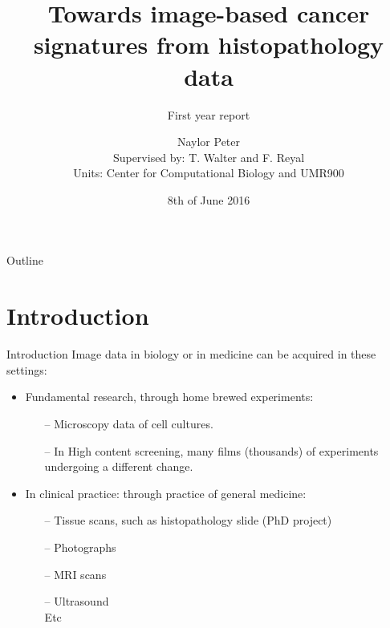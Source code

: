 \documentclass{beamer}
\title{Towards image-based cancer signatures from histopathology data}
\subtitle{First year report}
\author[Naylor Peter]{Naylor Peter\\{\small Supervised by: T. Walter and F. Reyal}\\{\small Units: Center for Computational Biology and UMR900}}
\date{8th of June 2016}
\begin{document}
\begin{frame}
  \titlepage
\end{frame}

\begin{frame}{Outline}
  \tableofcontents
\end{frame}

\section{Introduction}
\begin{frame}{Introduction}
Image data in biology or in medicine can be acquired in these settings:
\begin{itemize}
\item Fundamental research, through home brewed experiments: 

\begin{itemize}
\item[--] Microscopy data of cell cultures.
\item[--] In High content screening, many films (thousands) of experiments undergoing a different change.
\end{itemize}

\item In clinical practice: through practice of general medicine: 
\begin{itemize}
\item[--] Tissue scans, such as histopathology slide (PhD project)
\item[--] Photographs
\item[--] MRI scans
\item[--] Ultrasound \\
Etc
\end{itemize}

\end{itemize}

\end{frame}
\end{document}
